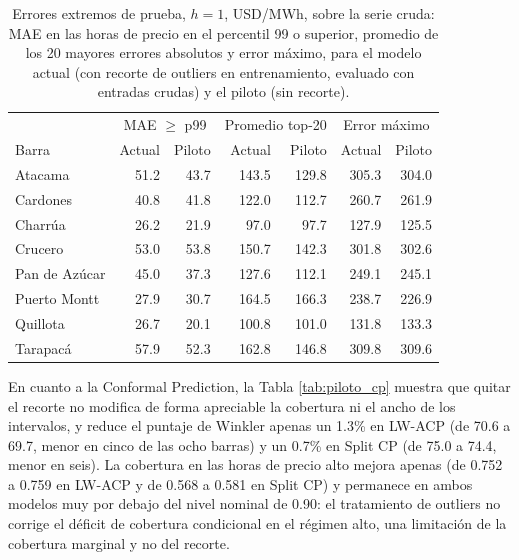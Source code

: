 \begin{table}[htbp]
    \centering
    \begin{tabular}{lrrrrrr}
        \toprule
        & \multicolumn{2}{c}{MAE $\geq$ p99} & \multicolumn{2}{c}{Promedio top-20} & \multicolumn{2}{c}{Error máximo} \\
        Barra & Actual & Piloto & Actual & Piloto & Actual & Piloto \\
        \midrule
        Atacama       & 51.2 & 43.7 & 143.5 & 129.8 & 305.3 & 304.0 \\
        Cardones      & 40.8 & 41.8 & 122.0 & 112.7 & 260.7 & 261.9 \\
        Charrúa       & 26.2 & 21.9 & 97.0  & 97.7  & 127.9 & 125.5 \\
        Crucero       & 53.0 & 53.8 & 150.7 & 142.3 & 301.8 & 302.6 \\
        Pan de Azúcar & 45.0 & 37.3 & 127.6 & 112.1 & 249.1 & 245.1 \\
        Puerto Montt  & 27.9 & 30.7 & 164.5 & 166.3 & 238.7 & 226.9 \\
        Quillota      & 26.7 & 20.1 & 100.8 & 101.0 & 131.8 & 133.3 \\
        Tarapacá      & 57.9 & 52.3 & 162.8 & 146.8 & 309.8 & 309.6 \\
        \bottomrule
    \end{tabular}
    \vspace{0.2cm}
    \caption{Errores extremos de prueba, $h=1$, USD/MWh, sobre la serie cruda: MAE en las horas de precio en el percentil 99 o superior, promedio de los 20 mayores errores absolutos y error máximo, para el modelo actual (con recorte de outliers en entrenamiento, evaluado con entradas crudas) y el piloto (sin recorte).}
    \label{tab:piloto_extremos}
\end{table}

En cuanto a la Conformal Prediction, la Tabla \ref{tab:piloto_cp} muestra que quitar el recorte no modifica de forma apreciable la cobertura ni el ancho de los intervalos, y reduce el puntaje de Winkler apenas un 1.3\% en LW-ACP (de 70.6 a 69.7, menor en cinco de las ocho barras) y un 0.7\% en Split CP (de 75.0 a 74.4, menor en seis). La cobertura en las horas de precio alto mejora apenas (de 0.752 a 0.759 en LW-ACP y de 0.568 a 0.581 en Split CP) y permanece en ambos modelos muy por debajo del nivel nominal de 0.90: el tratamiento de outliers no corrige el déficit de cobertura condicional en el régimen alto, una limitación de la cobertura marginal y no del recorte.

